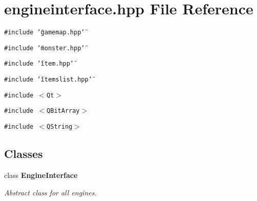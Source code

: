 \section{engineinterface.hpp File Reference}
\label{engineinterface_8hpp}
{\tt \#include \char`\"{}gamemap.hpp\char`\"{}}\par
{\tt \#include \char`\"{}monster.hpp\char`\"{}}\par
{\tt \#include \char`\"{}item.hpp\char`\"{}}\par
{\tt \#include \char`\"{}itemslist.hpp\char`\"{}}\par
{\tt \#include $<$Qt$>$}\par
{\tt \#include $<$QBit\-Array$>$}\par
{\tt \#include $<$QString$>$}\par
\subsection*{Classes}
\begin{CompactItemize}
\item 
class {\bf Engine\-Interface}
\begin{CompactList}\small\item\em Abstract class for all engines. \item\end{CompactList}\end{CompactItemize}
